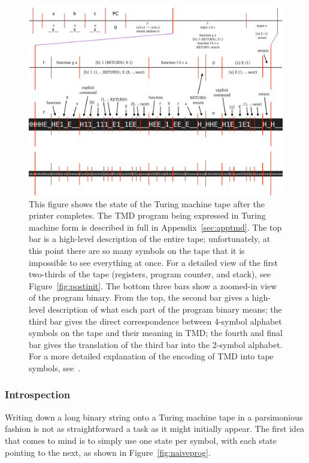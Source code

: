 \documentclass[11pt]{article}
\begin{document}
\begin{figure}
\begin{center}
\includegraphics[scale=0.42]{figs/postprog.png}
\caption{This figure shows the state of the Turing machine tape after the printer completes. The TMD program being expressed in Turing machine form is described in full in Appendix~\ref{sec:apptmd}. The top bar is a high-level description of the entire tape; unfortunately, at this point there are so many symbols on the tape that it is impossible to see everything at once. For a detailed view of the first two-thirds of the tape (registers, program counter, and stack), see Figure~\ref{fig:postinit}. The bottom three bars show a zoomed-in view of the program binary. From the top, the second bar gives a high-level description of what each part of the program binary means; the third bar gives the direct correspondence between 4-symbol alphabet symbols on the tape and their meaning in TMD; the fourth and final bar gives the translation of the third bar into the 2-symbol alphabet. For a more detailed explanation of the encoding of TMD into tape symbols, see~\cite{github}. \label{fig:postprog}}
\end{center}
\end{figure}

\subsubsection{Introspection}

Writing down a long binary string onto a Turing machine tape in a parsimonious fashion is not as straightforward a task as it might initially appear. The first idea that comes to mind is to simply use one state per symbol, with each state pointing to the next, as shown in Figure~\ref{fig:naiveprog}. \\
\end{document}
